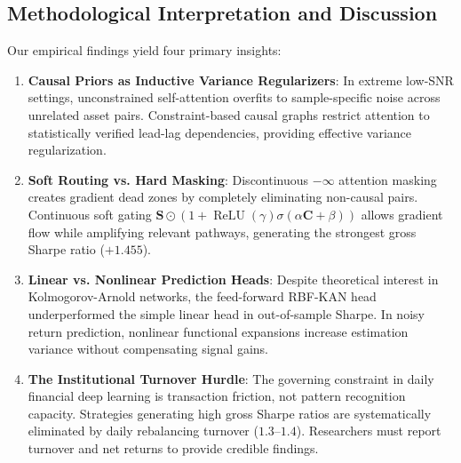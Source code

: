 \documentclass[10pt,twocolumn,a4paper]{article}
\begin{document}
\subsection{Methodological Interpretation and Discussion}
Our empirical findings yield four primary insights:
\begin{enumerate}
    \item \textbf{Causal Priors as Inductive Variance Regularizers}: In extreme low-SNR settings, unconstrained self-attention overfits to sample-specific noise across unrelated asset pairs. Constraint-based causal graphs restrict attention to statistically verified lead-lag dependencies, providing effective variance regularization.
    \item \textbf{Soft Routing vs. Hard Masking}: Discontinuous $-\infty$ attention masking creates gradient dead zones by completely eliminating non-causal pairs. Continuous soft gating $\mathbf{S} \odot (1 + \operatorname{ReLU}(\gamma)\sigma(\alpha \mathbf{C} + \beta))$ allows gradient flow while amplifying relevant pathways, generating the strongest gross Sharpe ratio ($+1.455$).
    \item \textbf{Linear vs. Nonlinear Prediction Heads}: Despite theoretical interest in Kolmogorov-Arnold networks, the feed-forward RBF-KAN head underperformed the simple linear head in out-of-sample Sharpe. In noisy return prediction, nonlinear functional expansions increase estimation variance without compensating signal gains.
    \item \textbf{The Institutional Turnover Hurdle}: The governing constraint in daily financial deep learning is transaction friction, not pattern recognition capacity. Strategies generating high gross Sharpe ratios are systematically eliminated by daily rebalancing turnover ($1.3\text{--}1.4$). Researchers must report turnover and net returns to provide credible findings.
\end{enumerate}

\newpage
\end{document}
